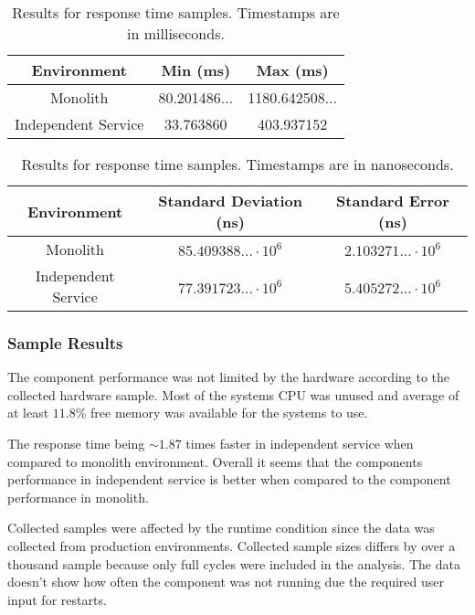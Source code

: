 \begin{table}[ht!]
    \begin{tabular}{|c c c|} 
        \hline
        Environment
        & Min (ms)
        & Max (ms) \\ [0.5ex] 
        
        \hline\hline
        Monolith
        & 80.201486... 
        & 1180.642508...
        \\ 
        
        Independent Service
        & 33.763860
        & 403.937152
        \\
        \hline
    \end{tabular}
    \caption{Results for response time samples. Timestamps are in milliseconds.}
    \label{table:response time results:2}
\end{table}

\begin{table}[ht!]
    \begin{tabular}{|c c c|} 
        \hline
        Environment
        & Standard Deviation (ns)
        & Standard Error (ns) \\ [0.5ex] 
        
        \hline\hline
        Monolith
        & $85.409388... \cdot 10^6$
        & $2.103271... \cdot 10^6$
        \\ 
        
        Independent Service
        & $77.391723... \cdot 10^6$
        & $5.405272... \cdot 10^6$
        \\ 
         \hline
    \end{tabular}
    \caption{Results for response time samples. Timestamps are in nanoseconds.}
    \label{table:response time results:3}
\end{table}

\subsubsection{Sample Results}
The component performance was not limited by the hardware according to the collected hardware sample.
Most of the systems CPU was unused and average of at least $11.8\%$ free memory was available for the systems to use.

The response time being $\sim 1.87$ times faster in independent service when compared to monolith environment.
Overall it seems that the components performance in independent service is better when compared to the component performance in monolith.

Collected samples were affected by the runtime condition since the data was collected from production environments.
Collected sample sizes differs by over a thousand sample because only full cycles were included in the analysis.
The data doesn't show how often the component was not running due the required user input for restarts.
